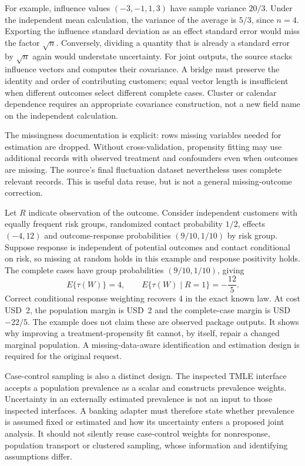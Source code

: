 For example, influence values $(-3,-1,1,3)$ have sample variance $20/3$.
Under the independent mean calculation, the variance of the average is
$5/3$, since $n=4$. Exporting the influence standard deviation as an effect
standard error would miss the factor $\sqrt n$. Conversely, dividing a
quantity that is already a standard error by $\sqrt n$ again would understate
uncertainty. For joint outputs, the source stacks influence vectors and
computes their covariance. A bridge must preserve the identity and order
of contributing customers; equal vector length is insufficient when
different outcomes select different complete cases. Cluster or calendar
dependence requires an appropriate covariance construction, not a new field
name on the independent calculation. \cite{exec21_effects_tmle,exec21_effects_reference}

The missingness documentation is explicit: rows missing variables needed
for estimation are dropped. Without cross-validation, propensity fitting
may use additional records with observed treatment and confounders even
when outcomes are missing. The source's final fluctuation dataset nevertheless
uses complete relevant records. This is useful data reuse, but is not a
general missing-outcome correction. \cite{exec21_effects_tmle}

Let $R$ indicate observation of the outcome. Consider independent customers
with equally frequent risk groups, randomized contact probability $1/2$,
effects $(-4,12)$ and outcome-response probabilities $(9/10,1/10)$ by risk
group. Suppose response is independent of potential outcomes and contact
conditional on risk, so missing at random holds in this example and response
positivity holds. The complete cases have group probabilities $(9/10,1/10)$,
giving
\begin{equation}
\label{exec21:effects-response}
 E\{\tau(W)\}=4,\qquad
 E\{\tau(W)\mid R=1\}=-\frac{12}{5}.
\end{equation}
Correct conditional response weighting recovers 4 in the exact known law.
At cost USD~2, the population margin is USD~2 and the complete-case margin
is USD~$-22/5$. The example does not claim these are observed package
outputs. It shows why improving a treatment-propensity fit cannot, by
itself, repair a changed marginal population. A missing-data-aware
identification and estimation design is required for the original request.
\cite{exec21_effects_reference}

Case-control sampling is also a distinct design. The inspected TMLE
interface accepts a population prevalence as a scalar and constructs
prevalence weights. Uncertainty in an externally estimated prevalence is
not an input to those inspected interfaces. A banking adapter must therefore
state whether prevalence is assumed fixed or estimated and how its
uncertainty enters a proposed joint analysis. It should not silently reuse
case-control weights for nonresponse, population transport or clustered
sampling, whose information and identifying assumptions differ.
\cite{exec21_effects_tmle}


